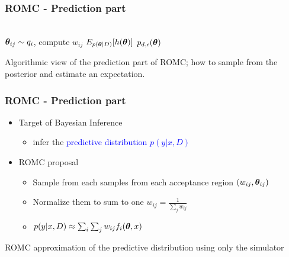 \begin{frame}
  \frametitle{ROMC - Prediction part}
  \begin{algorithmic}[1]
    \\\hrulefill
        \State $\boldsymbol{\theta}_{ij} \sim q_i$, compute $w_{ij}$ 
      \EndFor
    \EndFor
    \State $E_{p(\boldsymbol{\theta}|D)}[h(\boldsymbol{\theta})]$ 
    \State $p_{d,\epsilon}(\boldsymbol{\theta})$ 
    \\\hrulefill
    \EndProcedure
  \end{algorithmic}
  \noindent\makebox[\linewidth]{\rule{\paperwidth}{0.4pt}}
  Algorithmic view of the prediction part of ROMC; how to sample from the posterior and
  estimate an expectation.

\end{frame}

\begin{frame}
  \frametitle{ROMC - Prediction part}
  \begin{itemize}
  \item Target of Bayesian Inference
    \begin{itemize}
    \item infer the \textcolor{blue}{predictive distribution $p(y|x,D)$}
    \end{itemize}
  \item ROMC proposal
    \begin{itemize}
    \item Sample from each samples from each acceptance region $(w_{ij}, \boldsymbol{\theta}_{ij})$
      \item Normalize them to sum to one $w_{ij} = \frac{1}{\sum_j w_{ij}}$
      \item $p(y|x, D) \approx \sum_i \sum_j w_{ij}f_i(\boldsymbol{\theta}, x)$
      \end{itemize}
    \end{itemize}
  \noindent\makebox[\linewidth]{\rule{\paperwidth}{0.4pt}}
  ROMC approximation of the predictive distribution using only the simulator

\end{frame}


